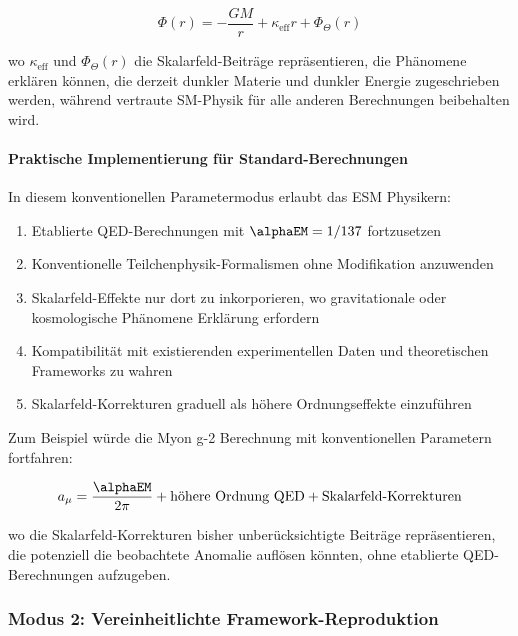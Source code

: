 	\begin{equation}
		\Phi(r) = -\frac{GM}{r} + \kappa_{\text{eff}} r + \Phi_{\Theta}(r)
	\end{equation}
	
	wo $\kappa_{\text{eff}}$ und $\Phi_{\Theta}(r)$ die Skalarfeld-Beiträge repräsentieren, die Phänomene erklären können, die derzeit dunkler Materie und dunkler Energie zugeschrieben werden, während vertraute SM-Physik für alle anderen Berechnungen beibehalten wird.
	
	\paragraph{Praktische Implementierung für Standard-Berechnungen}
	\label{par:practical_implementation}
	
	In diesem konventionellen Parametermodus erlaubt das ESM Physikern:
	
	\begin{enumerate}
		\item Etablierte QED-Berechnungen mit $\alphaEM = 1/137$ fortzusetzen
		\item Konventionelle Teilchenphysik-Formalismen ohne Modifikation anzuwenden
		\item Skalarfeld-Effekte nur dort zu inkorporieren, wo gravitationale oder kosmologische Phänomene Erklärung erfordern
		\item Kompatibilität mit existierenden experimentellen Daten und theoretischen Frameworks zu wahren
		\item Skalarfeld-Korrekturen graduell als höhere Ordnungseffekte einzuführen
	\end{enumerate}
	
	Zum Beispiel würde die Myon g-2 Berechnung mit konventionellen Parametern fortfahren:
	
	\begin{equation}
		a_\mu = \frac{\alphaEM}{2\pi} + \text{höhere Ordnung QED} + \text{Skalarfeld-Korrekturen}
	\end{equation}
	
	wo die Skalarfeld-Korrekturen bisher unberücksichtigte Beiträge repräsentieren, die potenziell die beobachtete Anomalie auflösen könnten, ohne etablierte QED-Berechnungen aufzugeben.
	
	\subsubsection{Modus 2: Vereinheitlichte Framework-Reproduktion}
	\label{subsubsec:mode2_unified_reproduction}
	
